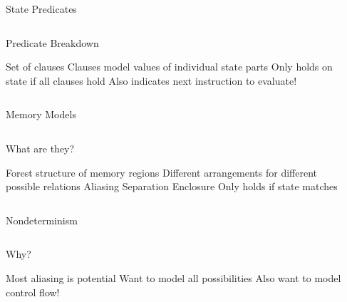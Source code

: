 \begin{frame}{State Predicates}
  \begin{columns}
    \begin{block}{Predicate Breakdown}
      \begin{outline}
        \1 Set of \alert{clauses}
        \1 Clauses model values of individual \alert{state parts}
        \1 Only holds on state if all clauses hold
        \1 Also indicates next instruction to evaluate!
      \end{outline}
    \end{block}

    \begin{example}[Predicate]
    \end{example}
  \end{columns}
\end{frame}

\begin{frame}{Memory Models}
  \begin{columns}
    \begin{block}{What are they?}
      \begin{outline}
        \1 \alert{Forest} structure of \alert{memory regions}
        \1 Different arrangements for different possible \alert{relations}
          \2 \alert{Aliasing}
          \2 \alert{Separation}
          \2 \alert{Enclosure}
        \1 Only holds if state matches
      \end{outline}
    \end{block}

    \begin{example}
    \end{example}
  \end{columns}
\end{frame}

\begin{frame}{Nondeterminism}
  \begin{columns}
    \begin{block}{Why?}
      \begin{outline}
        \1 Most aliasing is \alert{potential}
        \1 Want to model all possibilities
        \1 Also want to model control flow!
      \end{outline}
    \end{block}

    \begin{example}[Nondeterminism]
    \end{example}
  \end{columns}
\end{frame}


